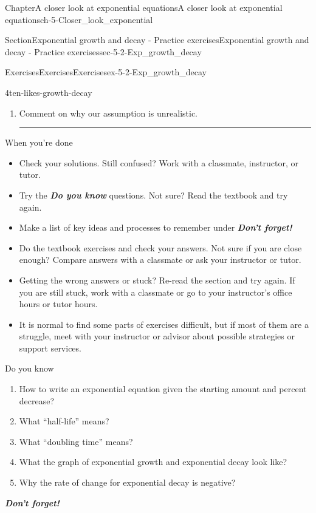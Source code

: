 \documentclass[twoside,11pt,]{book}
\newcommand{\alert}[1]{\textbf{\textit{#1}}}
\newlength{\workspacestrutwidth}
\numberwithin{equation}{section}
\begin{document}
\begin{chapterptx}{Chapter}{A closer look at exponential equations}{}{A closer look at exponential equations}{}{}{ch-5-Closer_look_exponential}
\begin{sectionptx}{Section}{Exponential growth and decay - Practice exercises}{}{Exponential growth and decay - Practice exercises}{}{}{sec-5-2-Exp_growth_decay}
\begin{exercises-subsection-numberless}{Exercises}{Exercises}{}{Exercises}{}{}{ex-5-2-Exp_growth_decay}
\begin{divisionexercise}{4}{}{}{ten-likes-growth-decay}
\begin{enumerate}[label=(\alph*),ref=\alph*]
\item{}Comment on why our assumption is unrealistic.%
\par\rule{\workspacestrutwidth}{1in}%
\end{enumerate}%
\end{divisionexercise}%
\end{exercises-subsection-numberless}
\begin{conclusion}{When you're done \textellipsis{}}%
%
\begin{itemize}[label=\textbullet]
\item{}Check your solutions. Still confused? Work with a classmate, instructor, or tutor.%
\item{}Try the \alert{Do you know} questions. Not sure? Read the textbook and try again.%
\item{}Make a list of key ideas and processes to remember under \alert{Don't forget!}%
\item{}Do the textbook exercises and check your answers. Not sure if you are close enough? Compare answers with a classmate or ask your instructor or tutor.%
\item{}Getting the wrong answers or stuck? Re-read the section and try again. If you are still stuck, work with a classmate or go to your instructor's office hours or tutor hours.%
\item{}It is normal to find some parts of exercises difficult, but if most of them are a struggle, meet with your instructor or advisor about possible strategies or support services.%
\end{itemize}
%
\end{conclusion}%
\begin{conclusion}{Do you know \textellipsis{}}%
%
\begin{enumerate}[label={\Alph*.}]
\item{}How to write an exponential equation given the starting amount and percent decrease?%
\item{}What ``half-life'' means?%
\item{}What ``doubling time'' means?%
\item{}What the graph of exponential growth and exponential decay look like?%
\item{}Why the rate of change for exponential decay is negative?%
\end{enumerate}
%
\par
\alert{Don't forget!}%
\end{conclusion}%
\end{sectionptx}

\end{chapterptx}
\end{document}
